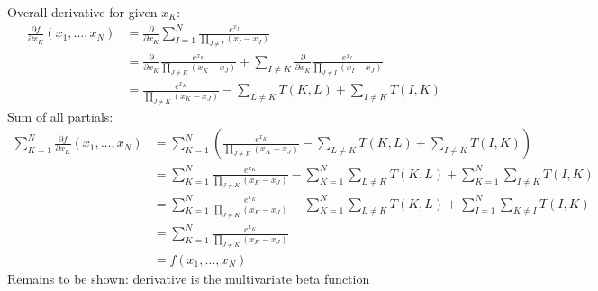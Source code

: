\documentclass{article}
\begin{document}
Overall derivative for given $x_K$:
\begin{align*}
  \frac{\partial f}{\partial x_K}(x_1, \ldots, x_N)
  &= \frac{\partial}{\partial x_K} \sum_{I=1}^N \frac{e^{x_I}}{\prod\limits_{J \neq I}(x_I-x_J)} \\
  &= \frac{\partial}{\partial x_K} \frac{e^{x_K}}{\prod\limits_{J \neq K}(x_K-x_J)} + \sum_{I \neq K} \frac{\partial}{\partial x_K} \frac{e^{x_I}}{\prod\limits_{J \neq I}(x_I-x_J)} \\
  &= \frac{e^{x_K}}{\prod\limits_{J \neq K}(x_K-x_J)}-\sum\limits_{L \neq K}T(K, L)+\sum_{I \neq K}T(I, K)
\end{align*}
Sum of all partials:
\begin{align*}
  \sum_{K=1}^N\frac{\partial f}{\partial x_K}(x_1, \ldots, x_N)
  &= \sum_{K=1}^N\left(\frac{e^{x_K}}{\prod\limits_{J \neq K}(x_K-x_J)}-\sum\limits_{L \neq K}T(K, L)+\sum_{I \neq K}T(I, K)\right) \\
  &= \sum_{K=1}^N\frac{e^{x_K}}{\prod\limits_{J \neq K}(x_K-x_J)}-\sum_{K=1}^N\sum\limits_{L \neq K}T(K, L)+\sum_{K=1}^N\sum_{I \neq K}T(I, K) \\
  &= \sum_{K=1}^N\frac{e^{x_K}}{\prod\limits_{J \neq K}(x_K-x_J)}-\sum_{K=1}^N\sum\limits_{L \neq K}T(K, L)+\sum_{I=1}^N\sum_{K \neq I}T(I, K) \\
  &= \sum_{K=1}^N\frac{e^{x_K}}{\prod\limits_{J \neq K}(x_K-x_J)} \\
  &= f(x_1, \ldots, x_N)
\end{align*}
Remains to be shown: derivative is the multivariate beta function
\end{document}
